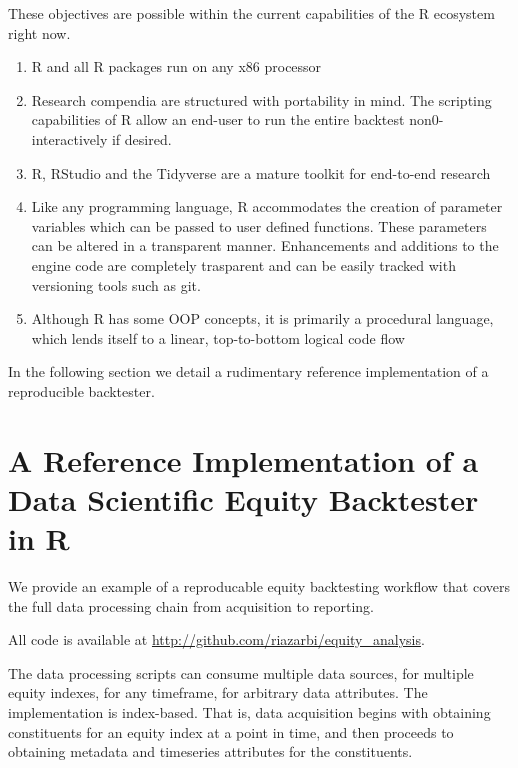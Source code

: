 \documentclass[11pt,preprint, authoryear]{elsarticle}
\numberwithin{equation}{section}
\numberwithin{figure}{section}
\numberwithin{table}{section}
\def\tightlist{} %
\begin{document}
These objectives are possible within the current capabilities of the R
ecosystem right now.

\begin{enumerate}
\def\labelenumi{\arabic{enumi}.}
\tightlist
\item
  R and all R packages run on any x86 processor
\item
  Research compendia are structured with portability in mind. The
  scripting capabilities of R allow an end-user to run the entire
  backtest non0-interactively if desired.
\item
  R, RStudio and the Tidyverse are a mature toolkit for end-to-end
  research
\item
  Like any programming language, R accommodates the creation of
  parameter variables which can be passed to user defined functions.
  These parameters can be altered in a transparent manner. Enhancements
  and additions to the engine code are completely trasparent and can be
  easily tracked with versioning tools such as git.
\item
  Although R has some OOP concepts, it is primarily a procedural
  language, which lends itself to a linear, top-to-bottom logical code
  flow
\end{enumerate}

In the following section we detail a rudimentary reference
implementation of a reproducible backtester.

\pagebreak

\section{\texorpdfstring{A Reference Implementation of a Data Scientific
Equity Backtester in
R\label{Backtester Documentation}}{A Reference Implementation of a Data Scientific Equity Backtester in R}}\label{a-reference-implementation-of-a-data-scientific-equity-backtester-in-r}

We provide an example of a reproducable equity backtesting workflow that
covers the full data processing chain from acquisition to reporting.

All code is available at
\url{http://github.com/riazarbi/equity_analysis}.

The data processing scripts can consume multiple data sources, for
multiple equity indexes, for any timeframe, for arbitrary data
attributes. The implementation is index-based. That is, data acquisition
begins with obtaining constituents for an equity index at a point in
time, and then proceeds to obtaining metadata and timeseries attributes
for the constituents.
\end{document}
